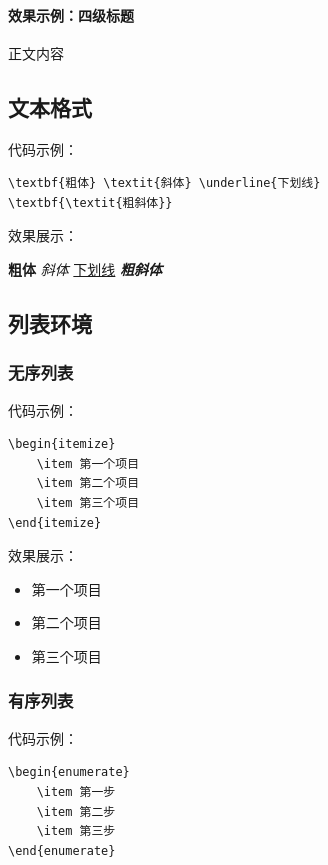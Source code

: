 \paragraph{效果示例：四级标题} 正文内容

\subsection{文本格式}

代码示例：

\begin{verbatim}
\textbf{粗体} \textit{斜体} \underline{下划线}
\textbf{\textit{粗斜体}}
\end{verbatim}

效果展示：

\textbf{粗体} \textit{斜体} \underline{下划线}
\textbf{\textit{粗斜体}}

\subsection{列表环境}

\subsubsection{无序列表}

代码示例：

\begin{verbatim}
\begin{itemize}
    \item 第一个项目
    \item 第二个项目
    \item 第三个项目
\end{itemize}
\end{verbatim}

效果展示：

\begin{itemize}
    \item 第一个项目
    \item 第二个项目
    \item 第三个项目
\end{itemize}

\subsubsection{有序列表}

代码示例：

\begin{verbatim}
\begin{enumerate}
    \item 第一步
    \item 第二步
    \item 第三步
\end{enumerate}
\end{verbatim}

